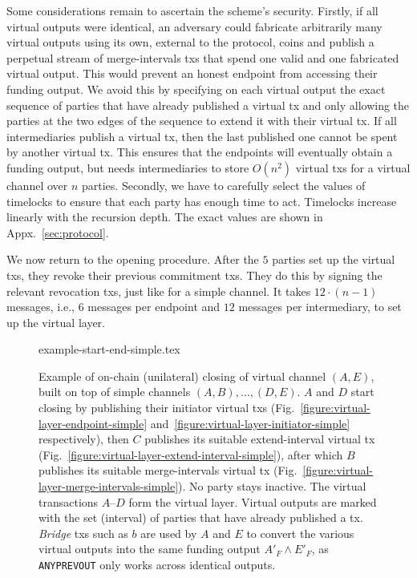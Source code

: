   Some considerations remain to ascertain the scheme's security.
  Firstly, if all virtual outputs
  were identical, an adversary could fabricate arbitrarily many virtual outputs using
  its own, external to the protocol, coins and publish a perpetual stream of
  merge-intervals txs that spend one valid and one fabricated virtual output.
  This would prevent an honest endpoint from accessing their funding output.
  We avoid this by
  specifying on each virtual output the exact sequence of parties that have
  already published a virtual tx and only allowing the parties at the two edges
  of the sequence
  to extend it with their virtual tx. If all intermediaries publish a virtual
  tx, then the last published one cannot be spent by
  another virtual
  tx. This ensures that the endpoints will eventually obtain a funding
  output, but needs intermediaries to store
  $O(n^2)$ virtual txs for a virtual channel over $n$ parties. Secondly,
  we have to carefully select the values of timelocks to ensure that
  each party has enough time to act. Timelocks increase linearly
  with the recursion depth. The exact values are shown
  in Appx.~\ref{sec:protocol}.

  We now return to the opening procedure. After the $5$ parties set up the virtual txs, they revoke their previous
  commitment
  txs. They do this by signing the relevant revocation txs, just like
  for a simple channel. It takes $12 \cdot (n-1)$ messages, i.e., $6$ messages
  per endpoint and $12$ messages per intermediary, to set up the virtual layer.

  \begin{figure}
    \centering
    {example-start-end-simple.tex}
    \caption{Example of on-chain (unilateral) closing of virtual channel $(A,
    E)$, built on top of simple channels $(A, B), \dots, (D, E)$. $A$ and $D$
    start closing by publishing their initiator virtual txs
    (Fig.~\ref{figure:virtual-layer-endpoint-simple}
    and~\ref{figure:virtual-layer-initiator-simple} respectively), then $C$
    publishes its suitable extend-interval virtual tx
    (Fig.~\ref{figure:virtual-layer-extend-interval-simple}), after which $B$
    publishes its suitable merge-intervals virtual tx
    (Fig.~\ref{figure:virtual-layer-merge-intervals-simple}). No party stays
    inactive. The virtual
    transactions $A$--$D$ form the virtual layer. Virtual outputs are marked
    with the set (interval) of parties that have already published a tx.
    \emph{Bridge} txs such as $b$ are used by $A$ and $E$ to convert the various
    virtual outputs into the same funding output $A'_F \wedge E'_F$, as \texttt{ANYPREVOUT} only
    works across identical outputs.}
    \label{figure:example-start-end-simple}
  \end{figure}

